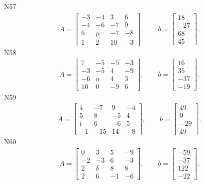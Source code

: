 \documentclass[11pt]{report}
\begin{document}
N57
\begin{align*}
 A = \left[\begin{matrix}-3 & -4 & 3 & 6\\-4 & -6 & -7 & 9\\6 & \mu & -7 & -8\\1 & 2 & 10 & -3\end{matrix}\right],
\qquad b = \left[\begin{matrix}18\\-27\\68\\45\end{matrix}\right]. 
 \end{align*}
N58
\begin{align*}
 A = \left[\begin{matrix}7 & -5 & -5 & -3\\-3 & -5 & 4 & -9\\-6 & \alpha & 4 & 3\\10 & 0 & -9 & 6\end{matrix}\right],
\qquad b = \left[\begin{matrix}16\\35\\-37\\-19\end{matrix}\right]. 
 \end{align*}
N59
\begin{align*}
 A = \left[\begin{matrix}4 & -7 & 9 & -4\\5 & 8 & -5 & 4\\t & 6 & -6 & 5\\-1 & -15 & 14 & -8\end{matrix}\right],
\qquad b = \left[\begin{matrix}49\\0\\-29\\49\end{matrix}\right]. 
 \end{align*}
N60
\begin{align*}
 A = \left[\begin{matrix}0 & 3 & 5 & -9\\-2 & -3 & 6 & -3\\2 & \delta & 8 & 8\\2 & 6 & -1 & -6\end{matrix}\right],
\qquad b = \left[\begin{matrix}-59\\-37\\122\\-22\end{matrix}\right]. 
 \end{align*}
\end{document}
